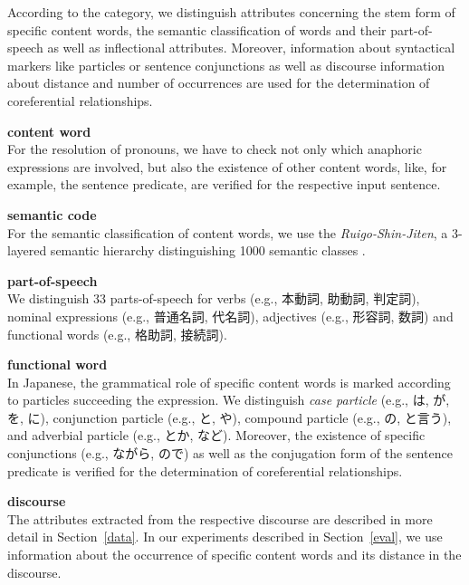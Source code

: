 According to the category, we distinguish attributes concerning the stem form of specific content words,
the semantic classification of words and their part-of-speech as well as inflectional attributes.
Moreover, information about syntactical markers like particles or sentence conjunctions as well as
discourse information about distance and number of occurrences are used for the determination of coreferential relationships.

\begin{deflist}{}
 \item[{\bf content word}] \hfill \\
   For the resolution of pronouns, we have to check not only which anaphoric expressions are involved,
   but also the existence of other content words, like, for example, the sentence predicate, are verified for the respective input sentence.
 \item[{\bf semantic code}] \hfill \\
   For the semantic classification of content words, we use the {\em Ruigo-Shin-Jiten}, a 3-layered semantic hierarchy
   distinguishing 1000 semantic classes \cite{Ohno81}.
 \item[{\bf part-of-speech}] \hfill \\
   We distinguish 33 parts-of-speech for verbs (e.g., 本動詞, 助動詞, 判定詞), nominal expressions (e.g., 普通名詞, 代名詞),
   adjectives (e.g., 形容詞, 数詞) and functional words (e.g., 格助詞, 接続詞). 
 \item[{\bf functional word}] \hfill \\
   In Japanese, the grammatical role of specific content words is marked according to particles succeeding the expression.
   We distinguish {\em case particle} (e.g., は, が, を, に), conjunction particle (e.g., と, や), compound particle
   (e.g., の, と言う), and adverbial particle (e.g., とか, など).
   Moreover, the existence of specific conjunctions (e.g., ながら, ので) as well as the conjugation form of the sentence predicate
   is verified for the determination of coreferential relationships.
 \item[{\bf discourse}] \hfill \\
   The attributes extracted from the respective discourse are described in more detail in Section~\ref{data}.
   In our experiments described in Section~\ref{eval}, we use information about the occurrence of specific
   content words and its distance in the discourse. \\[-0.5em]
\end{deflist}

